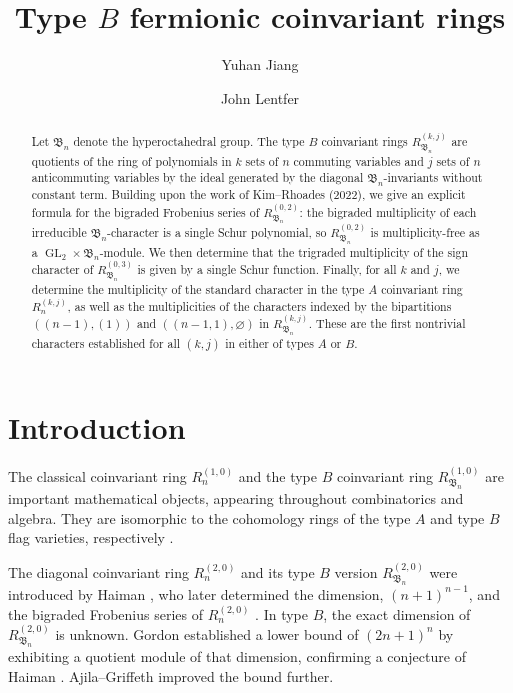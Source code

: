 \documentclass[12pt]{amsart}
\title{Type $B$ fermionic coinvariant rings}
\author[Y. Jiang]{Yuhan Jiang}
\author[J. Lentfer]{John Lentfer}
\theoremstyle{plain}
\theoremstyle{definition}
\begin{document}
\begin{abstract}
    Let $\mathfrak{B}_n$ denote the hyperoctahedral group.
    The type $B$ coinvariant rings $R_{\mathfrak{B}_n}^{(k,j)}$ are quotients of the ring of polynomials in $k$ sets of $n$ commuting variables and $j$ sets of $n$ anticommuting variables by the ideal generated by the diagonal $\mathfrak{B}_n$-invariants without constant term.
    Building upon the work of Kim--Rhoades (2022), we give an explicit formula for the bigraded Frobenius series of $R_{\mathfrak{B}_n}^{(0,2)}$: the bigraded multiplicity of each irreducible $\mathfrak{B}_n$-character is a single Schur polynomial, so $R_{\mathfrak{B}_n}^{(0,2)}$ is multiplicity-free as a $\operatorname{GL}_2 \times \mathfrak{B}_n$-module.
    We then determine that the trigraded multiplicity of the sign character of $R_{\mathfrak{B}_n}^{(0,3)}$ is given by a single Schur function.
    Finally, for all $k$ and $j$, we determine the multiplicity of the standard character in the type $A$ coinvariant ring $R_{n}^{(k,j)}$, as well as the multiplicities of the characters indexed by the bipartitions $((n-1),(1))$ and $((n-1,1),\varnothing)$ in $R_{\mathfrak{B}_n}^{(k,j)}$.
    These are the first nontrivial characters established for all $(k,j)$ in either of types $A$ or $B$.
\end{abstract}

\maketitle

\section{Introduction}\label{sec:introduction}

The classical coinvariant ring $R_n^{(1,0)}$ and the type $B$ coinvariant ring $R_{\mathfrak{B}_n}^{(1,0)}$ are important mathematical objects, appearing throughout combinatorics and algebra.
They are isomorphic to the cohomology rings of the type $A$ and type $B$ flag varieties, respectively \cite{Borel,Leray}.

The diagonal coinvariant ring $R_n^{(2,0)}$ and its type $B$ version $R_{\mathfrak{B}_n}^{(2,0)}$ were introduced by Haiman \cite{Haiman1994}, who later determined the dimension, $(n+1)^{n-1}$, and the bigraded Frobenius series of $R_n^{(2,0)}$ \cite{Haiman2002}. 
In type $B$, the exact dimension of $R_{\mathfrak{B}_n}^{(2,0)}$ is unknown. 
Gordon \cite{Gordon} established a lower bound of $(2n+1)^n$ by exhibiting a quotient module of that dimension, confirming a conjecture of Haiman \cite{Haiman1994}. Ajila--Griffeth \cite{AjilaGriffeth} improved the bound further.
\end{document}
